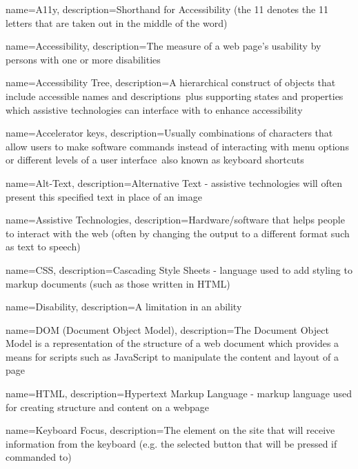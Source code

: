 {
    name=A11y,
    description={Shorthand for Accessibility (the 11 denotes the 11 letters that are taken out in the middle of the word)}
}

{
    name=Accessibility,
    description=The measure of a web page's usability by persons with one or more disabilities
}

{
    name=Accessibility Tree,
    description=A hierarchical construct of objects that include accessible names and descriptions\, plus supporting states and properties\, which assistive technologies can interface with to enhance accessibility
}

{
    name=Accelerator keys,
    description=Usually combinations of characters that allow users to make software commands instead of interacting with menu options or different levels of a user interface\, also known as keyboard shortcuts
}

{
    name=Alt-Text,
    description={Alternative Text - assistive technologies will often present this specified text in place of an image}
}

{
    name=Assistive Technologies,
    description={Hardware/software that helps people to interact with the web (often by changing the output to a different format such as text to speech)}
}

{
    name=CSS,
    description=Cascading Style Sheets - language used to add styling to markup documents (such as those written in HTML)
}

{
    name=Disability,
    description=A limitation in an ability
}

{
    name=DOM (Document Object Model),
    description=The Document Object Model is a representation of the structure of a web document which provides a means for scripts such as JavaScript to manipulate the content and layout of a page
}

{
    name=HTML,
    description=Hypertext Markup Language - markup language used for creating structure and content on a webpage
}

{
    name=Keyboard Focus,
    description=The element on the site that will receive information from the keyboard (e.g. the selected button that will be pressed if commanded to)
}

